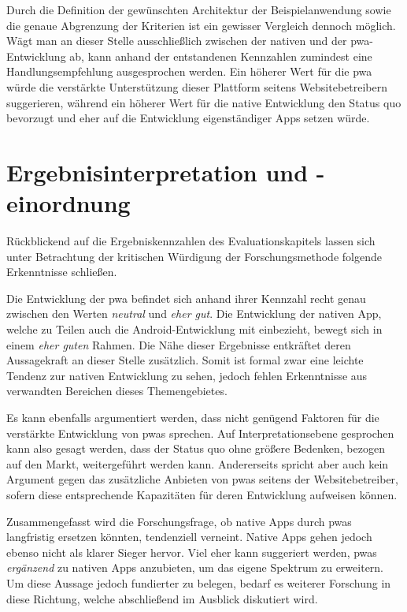 Durch die Definition der gewünschten Architektur der Beispielanwendung sowie die genaue Abgrenzung der Kriterien ist ein gewisser Vergleich dennoch möglich. Wägt man an dieser Stelle ausschließlich zwischen der nativen und der \ac{pwa}-Entwicklung ab, kann anhand der entstandenen Kennzahlen zumindest eine Handlungsempfehlung ausgesprochen werden. Ein höherer Wert für die \ac{pwa} würde die verstärkte Unterstützung dieser Plattform seitens Websitebetreibern suggerieren, während ein höherer Wert für die native Entwicklung den Status quo bevorzugt und eher auf die Entwicklung eigenständiger Apps setzen würde.

\section{Ergebnisinterpretation und -einordnung}
Rückblickend auf die Ergebniskennzahlen des Evaluationskapitels lassen sich unter Betrachtung der kritischen Würdigung der Forschungsmethode folgende Erkenntnisse schließen.

Die Entwicklung der \ac{pwa} befindet sich anhand ihrer Kennzahl recht genau zwischen den Werten \textit{neutral} und \textit{eher gut}. Die Entwicklung der nativen App, welche zu Teilen auch die Android-Entwicklung mit einbezieht, bewegt sich in einem \textit{eher guten} Rahmen. Die Nähe dieser Ergebnisse entkräftet deren Aussagekraft an dieser Stelle zusätzlich. Somit ist formal zwar eine leichte Tendenz zur nativen Entwicklung zu sehen, jedoch fehlen Erkenntnisse aus verwandten Bereichen dieses Themengebietes.

Es kann ebenfalls argumentiert werden, dass nicht genügend Faktoren für die verstärkte Entwicklung von \acp{pwa} sprechen. Auf Interpretationsebene gesprochen kann also gesagt werden, dass der Status quo ohne größere Bedenken, bezogen auf den Markt, weitergeführt werden kann. Andererseits spricht aber auch kein Argument gegen das zusätzliche Anbieten von \acp{pwa} seitens der Websitebetreiber, sofern diese entsprechende Kapazitäten für deren Entwicklung aufweisen können.

Zusammengefasst wird die Forschungsfrage, ob native Apps durch \acp{pwa} langfristig ersetzen könnten, tendenziell verneint. Native Apps gehen jedoch ebenso nicht als klarer Sieger hervor. Viel eher kann suggeriert werden, \acp{pwa} \textit{ergänzend} zu nativen Apps anzubieten, um das eigene Spektrum zu erweitern. Um diese Aussage jedoch fundierter zu belegen, bedarf es weiterer Forschung in diese Richtung, welche abschließend im Ausblick diskutiert wird.

